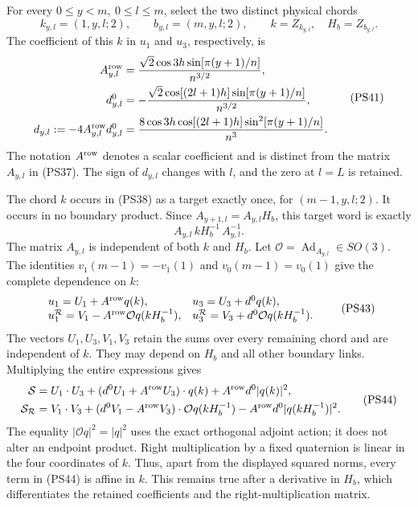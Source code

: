 \documentclass[11pt]{article}
\begin{document}
For every \(0\le y<m,\ 0\le l\le m\), select the two distinct
physical chords
\[
 k_{y,l}=(1,y,l;2),\qquad b_{y,l}=(m,y,l;2),
 \qquad k=Z_{k_{y,l}},\quad H_b=Z_{b_{y,l}}.
 \tag{PS40}
\]
The coefficient of this \(k\) in \(u_1\) and \(u_3\), respectively,
is
\[
 \begin{aligned}
 A^{\rm row}_{y,l}
   &={\sqrt2\cos3h\sin[\pi(y+1)/n]\over n^{3/2}},\\
 d^0_{y,l}
   &=-{\sqrt2\cos[(2l+1)h]\sin[\pi(y+1)/n]\over n^{3/2}},\\
 d_{y,l}:=-4A^{\rm row}_{y,l}d^0_{y,l}
   &={8\cos3h\cos[(2l+1)h]\sin^2[\pi(y+1)/n]\over n^3}.
 \end{aligned}
 \tag{PS41}
\]
The notation \(A^{\rm row}\) denotes a scalar coefficient and is
distinct from the matrix \(A_{y,l}\) in (PS37).
The sign of \(d_{y,l}\) changes with \(l\), and the zero at \(l=L\)
is retained.

The chord \(k\) occurs in (PS38) as a target exactly once, for
\((m-1,y,l;2)\). It occurs in no boundary product. Since
\(A_{y+1,l}=A_{y,l}H_b\), this target word is exactly
\[
 A_{y,l}\,kH_b^{-1}\,A_{y,l}^{-1}.
 \tag{PS42}
\]
The matrix \(A_{y,l}\) is independent of both \(k\) and \(H_b\).
Let \(\mathcal O=\operatorname{Ad}_{A_{y,l}}\in SO(3)\).
The identities \(v_1(m-1)=-v_1(1)\) and \(v_0(m-1)=v_0(1)\)
give the complete dependence on \(k\):
\[
 \begin{array}{ll}
 u_1=U_1+A^{\rm row}q(k),&
 u_3=U_3+d^0q(k),\\
 u_1^{\mathcal R}=V_1-A^{\rm row}\mathcal Oq(kH_b^{-1}),&
 u_3^{\mathcal R}=V_3+d^0\mathcal Oq(kH_b^{-1}).
 \end{array}
 \tag{PS43}
\]
The vectors \(U_1,U_3,V_1,V_3\) retain the sums over every
remaining chord and are independent of \(k\). They may depend on
\(H_b\) and all other boundary links. Multiplying the entire
expressions gives
\[
 \begin{aligned}
 \mathcal S={}&U_1\cdot U_3+
      (d^0U_1+A^{\rm row}U_3)\cdot q(k)
                 +A^{\rm row}d^0|q(k)|^2,\\
 \mathcal S_{\mathcal R}={}&V_1\cdot V_3+
      (d^0V_1-A^{\rm row}V_3)\cdot\mathcal Oq(kH_b^{-1})
                 -A^{\rm row}d^0|q(kH_b^{-1})|^2.
 \end{aligned}
 \tag{PS44}
\]
The equality \(|\mathcal O q|^2=|q|^2\) uses the exact orthogonal
adjoint action; it does not alter an endpoint product.
Right multiplication by a fixed quaternion is linear in the four
coordinates of \(k\). Thus, apart from the displayed squared
norms, every term in (PS44) is affine in \(k\). This remains true
after a derivative in \(H_b\), which differentiates the retained
coefficients and the right-multiplication matrix.
\end{document}
